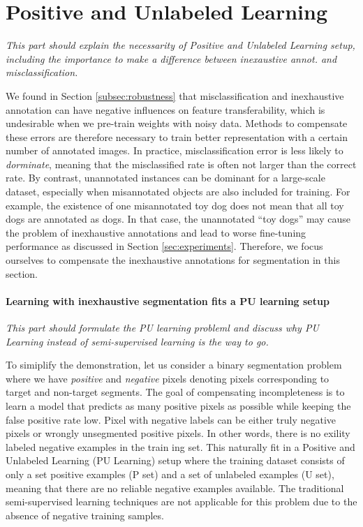 \section{Positive and Unlabeled Learning}
\label{sec:pulearning}

\noindent \textit{This part should explain the necessarity of Positive and Unlabeled Learning setup, including the importance to make a difference between inexaustive annot. and misclassification.}

\noindent
We found in Section \ref{subsec:robustness} that misclassification and inexhaustive annotation can have negative influences on feature transferability, which is undesirable when we pre-train weights with noisy data.
Methods to compensate these errors are therefore necessary to train better representation with a certain number of annotated images.
In practice, misclassification error is less likely to \textit{dorminate}, meaning that the misclassified rate is often not larger than the correct rate.
By contrast, unannotated instances can be dominant for a large-scale dataset, especially when misannotated objects are also included for training.
For example, the existence of one misannotated toy dog does not mean that all toy dogs are annotated as dogs.
In that case, the unannotated ``toy dogs'' may cause the problem of inexhaustive annotations and lead to worse fine-tuning performance as discussed in Section \ref{sec:experiments}.
Therefore, we focus ourselves to compensate the inexhaustive annotations for segmentation in this section.

\paragraph{Learning with inexhaustive segmentation fits a PU learning setup}
\noindent \textit{This part should formulate the PU learning probleml and discuss why PU Learning instead of semi-supervised learning is the way to go.}

\noindent
To simiplify the demonstration, let us consider a binary segmentation problem where we have \textit{positive} and \textit{negative} pixels denoting pixels corresponding to target and non-target segments.
The goal of compensating incompleteness is to learn a model that predicts as many positive pixels as possible while keeping the false positive rate low.
Pixel with negative labels can be either truly negative pixels or wrongly unsegmented positive pixels.
In other words, there is no exility labeled negative examples in the train ing set.
This naturally fit in a Positive and Unlabeled Learning (PU Learning) setup where the training dataset consists of only a set positive examples (P set) and a set of unlabeled examples (U set), meaning that there are no reliable negative examples available.
The traditional semi-supervised learning techniques are not applicable for this problem due to the absence of negative training samples.

